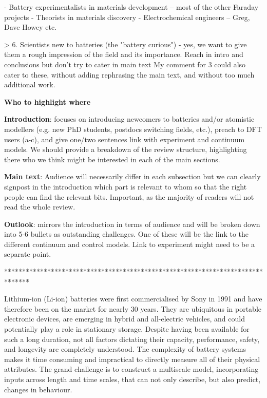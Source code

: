 \documentclass[../main.tex]{subfiles}
\begin{document}
- Battery experimentalists in materials development – most of the other Faraday projects
- Theorists in materials discovery
- Electrochemical engineers – Greg, Dave Howey etc.

> 6. Scientists new to batteries (the "battery curious") - yes, we want to give them a rough impression of the field and its importance. Reach in intro and conclusions but don’t try to cater in main text
My comment for 3 could also cater to these, without adding rephrasing the main text, and without too much additional work.

\textbf{Who to highlight where}

\textbf{Introduction}: focuses on introducing newcomers to batteries and/or atomistic modellers (e.g. new PhD students, postdocs switching fields, etc.), preach to DFT users (a-c), and give one/two sentences link with experiment and continuum models. We should provide a breakdown of the review structure, highlighting there who we think might be interested in each of the main sections.

\textbf{Main text}: Audience will necessarily differ in each subsection but we can clearly signpost in the introduction which part is relevant to whom so that the right people can find the relevant bits. Important, as the majority of readers will not read the whole review.

\textbf{Outlook}: mirrors the introduction in terms of audience and will be broken down into 5-6 bullets as outstanding challenges. One of these will be the link to the different continuum and control models. Link to experiment might need to be a separate point.


*******************************************************************************



Lithium-ion (Li-ion) batteries were first commercialised by Sony in 1991 and have therefore been on the market for nearly 30 years. They are ubiquitous in portable electronic devices, are emerging in hybrid and all-electric vehicles, and could potentially play a role in stationary storage. Despite having been available for such a long duration, not all factors dictating their capacity, performance, safety, and longevity are completely understood. The complexity of battery systems makes it time consuming and impractical to directly measure all of their physical attributes. The grand challenge is to construct a multiscale model, incorporating inputs across length and time scales, that can not only describe, but also predict, changes in behaviour.
\end{document}
